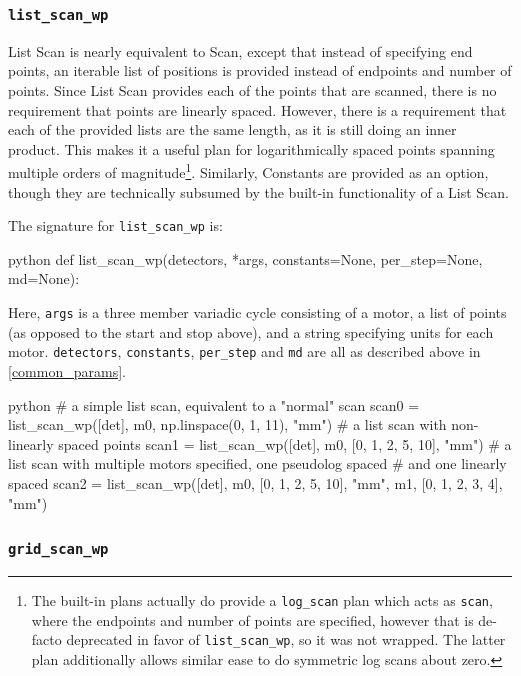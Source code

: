 \subsubsection{\texttt{list\_scan\_wp}}

List Scan is nearly equivalent to Scan, except that instead of specifying end points, an iterable list of positions is provided instead of endpoints and number of points.
Since List Scan provides each of the points that are scanned, there is no requirement that points are linearly spaced.
However, there is a requirement that each of the provided lists are the same length, as it is still doing an inner product.
This makes it a useful plan for logarithmically spaced points spanning multiple orders of magnitude\footnote{The built-in plans actually do provide a \texttt{log\_scan} plan which acts as \texttt{scan}, where the endpoints and number of points are specified, however that is de-facto deprecated in favor of \texttt{list\_scan\_wp}, so it was not wrapped. The latter plan additionally allows similar ease to do symmetric log scans about zero.}.
Similarly, Constants are provided as an option, though they are technically subsumed by the built-in functionality of a List Scan.

The signature for \texttt{list\_scan\_wp} is:

\begin{codefragment}{python}
def list_scan_wp(detectors, *args, constants=None, per_step=None, md=None):
\end{codefragment}

Here, \texttt{args} is a three member variadic cycle consisting of a motor, a list of points (as opposed to the start and stop above), and a string specifying units for each motor.
\texttt{detectors}, \texttt{constants}, \texttt{per\_step} and \texttt{md} are all as described above in \ref{common_params}.

\begin{codefragment}{python}
# a simple list scan, equivalent to a "normal" scan
scan0 = list_scan_wp([det], m0, np.linspace(0, 1, 11), "mm")
# a list scan with non-linearly spaced points
scan1 = list_scan_wp([det], m0, [0, 1,  2, 5, 10], "mm")
# a list scan with multiple motors specified, one pseudolog spaced
# and one linearly spaced
scan2 = list_scan_wp([det], m0, [0, 1, 2, 5, 10], "mm",
	                    m1, [0, 1, 2, 3, 4], "mm")
\end{codefragment}

\subsubsection{\texttt{grid\_scan\_wp}}

